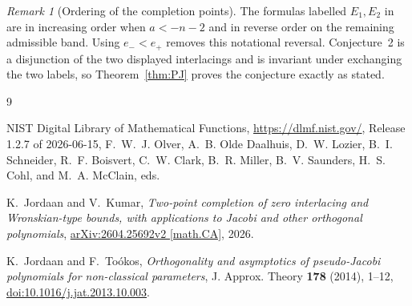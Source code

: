 \documentclass[11pt]{amsart}
\theoremstyle{remark}
\newtheorem{remark}[theorem]{Remark}
\begin{document}
\begin{remark}[Ordering of the completion points]\label{rem:ordering}
The formulas labelled $E_1,E_2$ in~\cite[(6.8)--(6.9)]{JordaanKumar} are
in increasing order when $a<-n-2$ and in reverse order on the remaining
admissible band.  Using $e_-<e_+$ removes this notational reversal.
Conjecture~2 is a disjunction of the two displayed interlacings and is
invariant under exchanging the two labels, so Theorem~\ref{thm:PJ} proves the
conjecture exactly as stated.
\end{remark}

\small
\begin{thebibliography}{9}

NIST Digital Library of Mathematical Functions,
\url{https://dlmf.nist.gov/}, Release 1.2.7 of 2026-06-15,
F.~W.~J. Olver, A.~B. Olde Daalhuis, D.~W. Lozier, B.~I. Schneider,
R.~F. Boisvert, C.~W. Clark, B.~R. Miller, B.~V. Saunders, H.~S. Cohl,
and M.~A. McClain, eds.

K.~Jordaan and V.~Kumar,
\emph{Two-point completion of zero interlacing and Wronskian-type bounds,
with applications to Jacobi and other orthogonal polynomials},
\href{https://arxiv.org/abs/2604.25692v2}
{arXiv:2604.25692v2 [math.CA]}, 2026.

K.~Jordaan and F.~To\'okos,
\emph{Orthogonality and asymptotics of pseudo-Jacobi polynomials for
non-classical parameters},
J. Approx. Theory \textbf{178} (2014), 1--12,
\href{https://doi.org/10.1016/j.jat.2013.10.003}
{doi:10.1016/j.jat.2013.10.003}.

\end{thebibliography}
\end{document}
